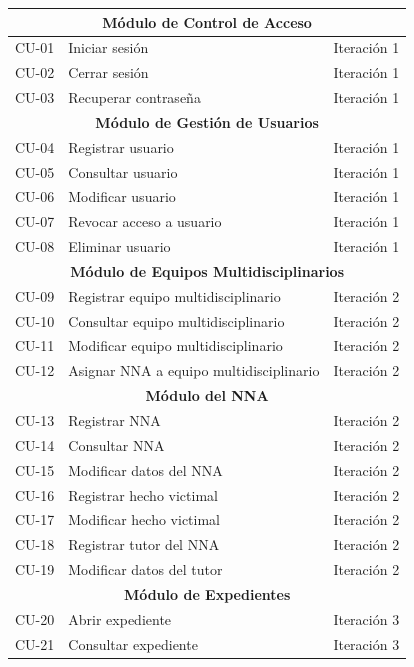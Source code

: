 \begin{center}
\begin{longtable}{|c|p{}|c|}
		\multicolumn{3}{|c|}{\textbf{Módulo de Control de Acceso}} \\
		\hline
		CU-01 & Iniciar sesión            & Iteración 1 \\
		CU-02 & Cerrar sesión             & Iteración 1 \\
		CU-03 & Recuperar contraseña      & Iteración 1 \\
		\hline
		\multicolumn{3}{|c|}{\textbf{Módulo de Gestión de Usuarios}} \\
		\hline
		CU-04 & Registrar usuario         & Iteración 1 \\
		CU-05 & Consultar usuario         & Iteración 1 \\
		CU-06 & Modificar usuario         & Iteración 1 \\
		CU-07 & Revocar acceso a usuario  & Iteración 1 \\
		CU-08 & Eliminar usuario          & Iteración 1 \\
		\hline
		\multicolumn{3}{|c|}{\textbf{Módulo de Equipos Multidisciplinarios}} \\
		\hline
		CU-09 & Registrar equipo multidisciplinario        & Iteración 2 \\
		CU-10 & Consultar equipo multidisciplinario        & Iteración 2 \\
		CU-11 & Modificar equipo multidisciplinario        & Iteración 2 \\
		CU-12 & Asignar NNA a equipo multidisciplinario    & Iteración 2 \\
		\hline
		\multicolumn{3}{|c|}{\textbf{Módulo del NNA}} \\
		\hline
		CU-13 & Registrar NNA                 & Iteración 2 \\
		CU-14 & Consultar NNA                 & Iteración 2 \\
		CU-15 & Modificar datos del NNA       & Iteración 2 \\
		CU-16 & Registrar hecho victimal      & Iteración 2 \\
		CU-17 & Modificar hecho victimal      & Iteración 2 \\
		CU-18 & Registrar tutor del NNA       & Iteración 2 \\
		CU-19 & Modificar datos del tutor     & Iteración 2 \\
		\hline
		\multicolumn{3}{|c|}{\textbf{Módulo de Expedientes}} \\
		\hline
		CU-20 & Abrir expediente                          & Iteración 3 \\
		CU-21 & Consultar expediente                      & Iteración 3 \\

\end{longtable}
\end{center}
